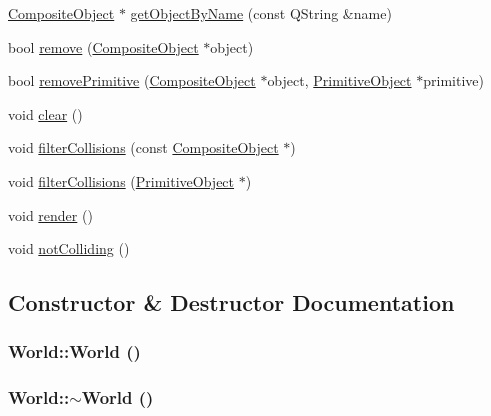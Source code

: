 \begin{DoxyCompactItemize}
\hyperlink{class_robot_model_1_1_composite_object}{CompositeObject} $\ast$ \hyperlink{class_robot_model_1_1_world_a2ccf0c4dd817ecae42edbb82f54289a2}{getObjectByName} (const QString \&name)
\item 
bool \hyperlink{class_robot_model_1_1_world_a40f4e4bfed5121602f993bf561932b07}{remove} (\hyperlink{class_robot_model_1_1_composite_object}{CompositeObject} $\ast$object)
\item 
bool \hyperlink{class_robot_model_1_1_world_a498c5d79bc95bd308680c2a8c5e475b0}{removePrimitive} (\hyperlink{class_robot_model_1_1_composite_object}{CompositeObject} $\ast$object, \hyperlink{class_robot_model_1_1_primitive_object}{PrimitiveObject} $\ast$primitive)
\item 
void \hyperlink{class_robot_model_1_1_world_a24f6906f2e4f0c761653a8f9e42588a6}{clear} ()
\item 
void \hyperlink{class_robot_model_1_1_world_a530cb18d1249f7c6e94c4ba6879cf36a}{filterCollisions} (const \hyperlink{class_robot_model_1_1_composite_object}{CompositeObject} $\ast$)
\item 
void \hyperlink{class_robot_model_1_1_world_a38aea4885454231131d4ccb7945138dc}{filterCollisions} (\hyperlink{class_robot_model_1_1_primitive_object}{PrimitiveObject} $\ast$)
\item 
void \hyperlink{class_robot_model_1_1_world_a150eab10c21532162bb698d72aecec16}{render} ()
\item 
void \hyperlink{class_robot_model_1_1_world_a2300046adaa75a432476dbef1934bb01}{notColliding} ()
\end{DoxyCompactItemize}


\subsection{Constructor \& Destructor Documentation}
\hypertarget{class_robot_model_1_1_world_afa39d4e6f714a7a3691ac0c656f5e8a8}{
\subsubsection[{World}]{\setlength{\rightskip}{0pt plus 5cm}World::World ()}}
\label{class_robot_model_1_1_world_afa39d4e6f714a7a3691ac0c656f5e8a8}
\hypertarget{class_robot_model_1_1_world_a8c73fba541a5817fff65147ba47cd827}{
\subsubsection[{$\sim$World}]{\setlength{\rightskip}{0pt plus 5cm}World::$\sim$World ()}}
\label{class_robot_model_1_1_world_a8c73fba541a5817fff65147ba47cd827}


